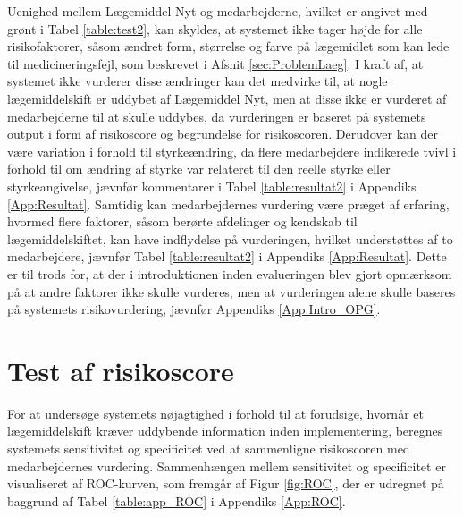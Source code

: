 Uenighed mellem Lægemiddel Nyt og medarbejderne, hvilket er angivet med grønt i Tabel \ref{table:test2}, kan skyldes, at systemet ikke tager højde for alle risikofaktorer, såsom ændret form, størrelse og farve på lægemidlet som kan lede til medicineringsfejl, som beskrevet i Afsnit \ref{sec:ProblemLaeg}. I kraft af, at systemet ikke vurderer disse ændringer kan det medvirke til, at nogle lægemiddelskift er uddybet af Lægemiddel Nyt, men at disse ikke er vurderet af medarbejderne til at skulle uddybes, da vurderingen er baseret på systemets output i form af risikoscore og begrundelse for risikoscoren. Derudover kan der være variation i forhold til styrkeændring, da flere medarbejdere indikerede tvivl i forhold til om ændring af styrke var relateret til den reelle styrke eller styrkeangivelse, jævnfør kommentarer i Tabel \ref{table:resultat2} i Appendiks \ref{App:Resultat}. Samtidig kan medarbejdernes vurdering være præget af erfaring, hvormed flere faktorer, såsom berørte afdelinger og kendskab til lægemiddelskiftet, kan have indflydelse på vurderingen, hvilket understøttes af to medarbejdere, jævnfør Tabel \ref{table:resultat2} i Appendiks \ref{App:Resultat}. Dette er til trods for, at der i introduktionen inden evalueringen blev gjort opmærksom på at andre faktorer ikke skulle vurderes, men at vurderingen alene skulle baseres på systemets risikovurdering, jævnfør Appendiks \ref{App:Intro_OPG}. 

\section{Test af risikoscore}
For at undersøge systemets nøjagtighed i forhold til at forudsige, hvornår et lægemiddelskift kræver uddybende information inden implementering, beregnes systemets sensitivitet og specificitet ved at sammenligne risikoscoren med medarbejdernes vurdering. Sammenhængen mellem sensitivitet og specificitet er visualiseret af ROC-kurven, som fremgår af Figur \ref{fig:ROC}, der er udregnet på baggrund af Tabel \ref{table:app_ROC} i Appendiks \ref{App:ROC}. 

